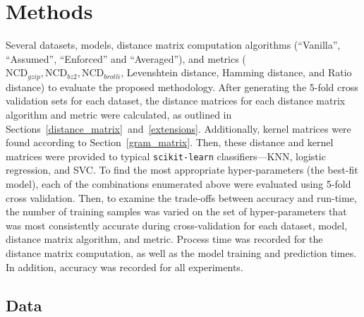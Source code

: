 \documentclass[preprint,12pt]{elsarticle}
\begin{document}
\section{Methods}
\label{methods}

Several datasets, models, distance matrix computation algorithms (``Vanilla'', ``Assumed'', ``Enforced'' and ``Averaged''), and metrics ($\text{NCD}_{gzip}, \text{NCD}_{bz2}, \text{NCD}_{brotli}$, Levenshtein distance, Hamming distance, and Ratio distance) to evaluate the proposed methodology.
After generating the 5-fold cross validation sets for each dataset, the distance matrices for each distance matrix algorithm and metric were calculated, as outlined in Sections~\ref{distance_matrix}~and~\ref{extensions}.
Additionally, kernel matrices were found according to Section~\ref{gram_matrix}.
Then, these distance and kernel matrices were provided to typical \texttt{scikit-learn} classifiers---KNN, logistic regression, and SVC.
To find the most appropriate hyper-parameters (the best-fit model), each of the combinations enumerated above were evaluated using 5-fold cross validation.
Then, to examine the trade-offs between accuracy and run-time, the number of training samples was varied on the set of hyper-parameters that was most consistently accurate during cross-validation for each dataset, model, distance matrix algorithm, and metric.
Process time was recorded for the distance matrix computation, as well as the model training and prediction times.
In addition, accuracy was recorded for all experiments.



\subsection{Data}
\label{datasets}
\end{document}
